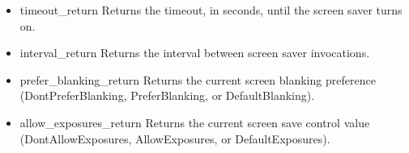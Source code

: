 \documentclass{report}
\begin{document}
\begin{itemize}
\begin{itemize}
                \item timeout\_return Returns the timeout, in seconds, until the screen saver turns on.
                \item interval\_return Returns the interval between screen saver invocations.
                \item prefer\_blanking\_return Returns the current screen blanking preference (DontPreferBlanking, PreferBlanking, or DefaultBlanking).
                \item allow\_exposures\_return Returns the current screen save control value (DontAllowExposures, AllowExposures, or DefaultExposures).
            \end{itemize}



    \end{itemize}
\end{document}
